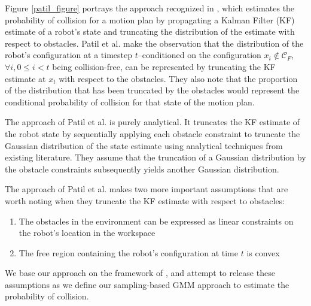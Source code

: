 \documentclass[journal]{IEEEtran}
\begin{document}
Figure \ref{patil_figure} portrays the approach recognized in \cite{IEEEhowto:patil}, which estimates the probability of collision for a motion plan by propagating a Kalman Filter (KF) estimate of a robot's state and truncating the distribution of the estimate with respect to obstacles. Patil et al. make the observation that the distribution of the robot's configuration at a timestep $t$--conditioned on the configuration $x_i \notin \mathcal{C}_F$, $\forall i, 0 \leq i < t $ being collision-free, can be represented by truncating the KF estimate at $x_t$ with respect to the obstacles. They also note that the proportion of the distribution that has been truncated by the obstacles would represent the conditional probability of collision for that state of the motion plan.

The approach of Patil et al. is purely analytical. It truncates the KF estimate of the robot state by sequentially applying each obstacle constraint to truncate the Gaussian distribution of the state estimate using analytical techniques from existing literature. They assume that the truncation of a Gaussian distribution by the obstacle constraints subsequently yields another Gaussian distribution.

The approach of Patil et al. makes two more important assumptions that are worth noting when they truncate the KF estimate with respect to obstacles:
\begin{enumerate}
  \item The obstacles in the environment can be expressed as linear constraints on the robot's location in the workspace
  \item The free region containing the robot's configuration at time $t$ is convex
\end{enumerate}

We base our approach on the framework of \cite{IEEEhowto:patil}, and attempt to release these assumptions as we define our sampling-based GMM approach to estimate the probability of collision.

\end{document}
